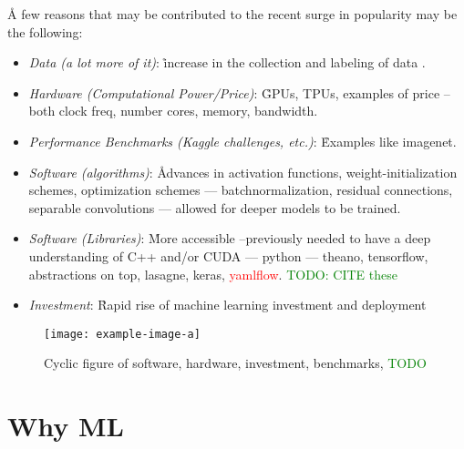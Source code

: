 
\r{A few reasons that may be contributed to the recent surge in popularity may be the following:}

\begin{itemize}
	
	\item \textit{Data (a lot more of it)}: \r{increase in the collection and labeling of data} .
	
	\item \textit{Hardware (Computational Power/Price)}: \r{GPUs, TPUs, examples of price -- both clock freq, number cores, memory, bandwidth}.
	
	\item \textit{Performance Benchmarks (Kaggle challenges, etc.)}: \r{Examples like imagenet}.
	
	\item \textit{Software (algorithms)}: \r{Advances in activation functions, weight-initialization schemes, optimization schemes --- batchnormalization, residual connections, separable convolutions --- allowed for deeper models to be trained.}
	
	\item \textit{Software (Libraries)}: \r{More accessible --previously needed to have a deep understanding of C++ and/or CUDA --- python --- theano, tensorflow, abstractions on top, lasagne, keras, \textcolor{red}{yamlflow}. \textcolor{green}{TODO: CITE these} }
	
	\item \textit{Investment}: \r{Rapid rise of machine learning investment and deployment}
	
\end{itemize}

\begin{figure}[htp]
	\centering
	\texttt{[image: example-image-a]}\hfil
	\caption{Cyclic figure of software, hardware, investment, benchmarks, \textcolor{green}{TODO}}
	\label{fig:cyclic_rise_of_dl_overview}
\end{figure}

\section{Why ML}




